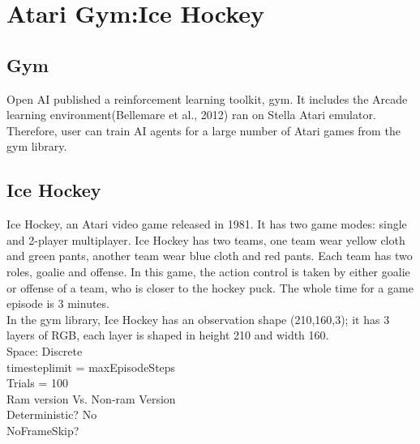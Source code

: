\chapter{Atari Gym:Ice Hockey}
\label{cha:intro}


\section{Gym}
Open AI published a reinforcement learning toolkit, gym. It includes the Arcade learning environment(Bellemare et al., 2012) ran on Stella Atari emulator. Therefore, user can train AI agents for a large number of Atari games from the gym library. 


\section{Ice Hockey}
Ice Hockey, an Atari video game released in 1981. It has two game modes: single and 2-player multiplayer. Ice Hockey has two teams, one team wear yellow cloth and green pants, another team wear blue cloth and red pants. Each team has two roles, goalie and offense. In this game, the action control is taken by either goalie or offense of a team, who is closer to the hockey puck. The whole time for a game episode is 3 minutes. \\

In the gym library, Ice Hockey has an observation shape (210,160,3); it has 3 layers of RGB, each layer is shaped in height 210 and width 160. \\

Space: Discrete \\
timesteplimit = maxEpisodeSteps\\
Trials = 100\\
Ram version Vs. Non-ram Version\\
Deterministic? No\\
NoFrameSkip?\\

